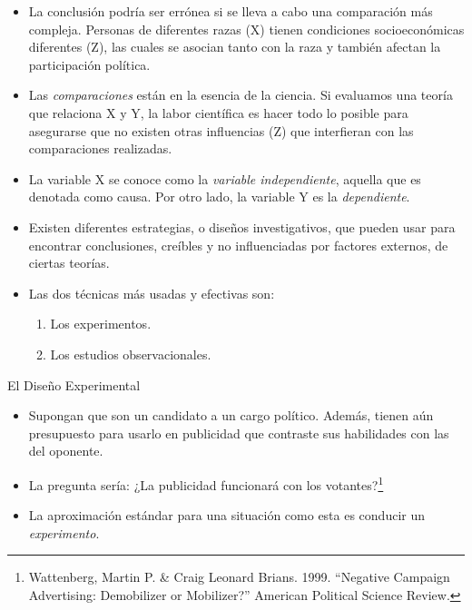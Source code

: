 \documentclass[xcolor=dvipsnames]{beamer}
\begin{document}
\begin{frame}
	\begin{itemize}
		\justifying
\item La conclusión podría ser errónea si se lleva a cabo una comparación más compleja. Personas de diferentes razas (X) tienen condiciones socioeconómicas diferentes (Z), las cuales se asocian tanto con la raza y también afectan la participación política.
\item Las \emph{comparaciones} están en la esencia de la ciencia. Si evaluamos una teoría que relaciona X y Y, la labor científica es hacer todo lo posible para asegurarse que no existen otras influencias (Z) que interfieran con las comparaciones realizadas.
\item La variable X se conoce como la \emph{variable independiente}, aquella que es denotada como causa. Por otro lado, la variable Y es la \emph{dependiente}.

	\end{itemize}
\end{frame}

\begin{frame}
	\begin{itemize}
		\justifying
\item Existen diferentes estrategias, o diseños investigativos, que pueden usar para encontrar conclusiones, creíbles y no influenciadas por factores externos, de ciertas teorías.
\item Las dos técnicas más usadas y efectivas son:
\begin{enumerate}
\item Los experimentos.
\item Los estudios observacionales. 
\end{enumerate}
	\end{itemize}
\end{frame}

\begin{frame}{El Diseño Experimental}
\begin{itemize}
\justifying
\item Supongan que son un candidato a un cargo político. Además, tienen aún presupuesto para usarlo en publicidad que contraste sus habilidades con las del oponente. 
\item La pregunta sería: ¿La publicidad funcionará con los votantes?\footnote{Wattenberg, Martin P. \& Craig Leonard Brians. 1999. “Negative Campaign Advertising: Demobilizer or Mobilizer?” American Political Science Review.}
\item La aproximación estándar para una situación como esta es conducir un \emph{experimento}.
\end{itemize}
\end{frame}
\end{document}

